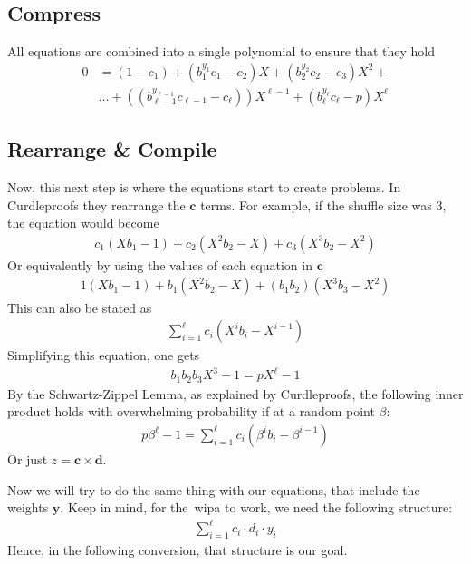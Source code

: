 \subsection{Compress}\label{subsec:compress}
All equations are combined into a single polynomial to ensure that they hold
\begin{align}
    0&=(1-c_1)+(b_{1}^{y_{1}}c_1-c_2)X+(b_{2}^{y_{2}}c_2-c_3)X^2+\\
    &\dots+((b_{\ell-1}^{y_{\ell-1}}c_{\ell-1}-c_\ell))X^{\ell-1}+(b_{\ell}^{y_{\ell}}c_{\ell}-p)X^{\ell}
\end{align}

\subsection{Rearrange \& Compile}\label{subsec:rearrange}
Now, this next step is where the equations start to create problems.
In Curdleproofs they rearrange the $\mathbf{c}$ terms.
For example, if the shuffle size was 3, the equation would become
\begin{align}
    c_1(Xb_1-1)+c_2(X^2b_2-X)+c_3(X^3b_2-X^2)
\end{align}
Or equivalently by using the values of each equation in $\mathbf{c}$
\begin{align}
    1(Xb_1-1)+b_1(X^2b_2-X)+(b_1b_2)(X^3b_3-X^2)
\end{align}
This can also be stated as
\begin{align}
    \sum_{i=1}^{\ell}c_i(X^{i}b_{i}-X^{i-1})
\end{align}
Simplifying this equation, one gets
\begin{align}
    b_{1}b_{2}b_{3}X^3-1=pX^{\ell}-1
\end{align}
By the Schwartz-Zippel Lemma, as explained by Curdleproofs, the following inner product holds with overwhelming probability if at a random point $\beta$:
\begin{align}
    p\beta^{\ell}-1=\sum_{i=1}^{\ell}c_i(\beta^{i}b_i-\beta^{i-1})
\end{align}
Or just $z=\mathbf{c}\times\mathbf{d}$.

Now we will try to do the same thing with our equations, that include the weights $\mathbf{y}$.
Keep in mind, for the~\gls{wipa} to work, we need the following structure:
\begin{align}\label{eq:structure}
    \sum_{i=1}^{\ell}c_i\cdot d_i\cdot y_i
\end{align}
Hence, in the following conversion, that structure is our goal.

